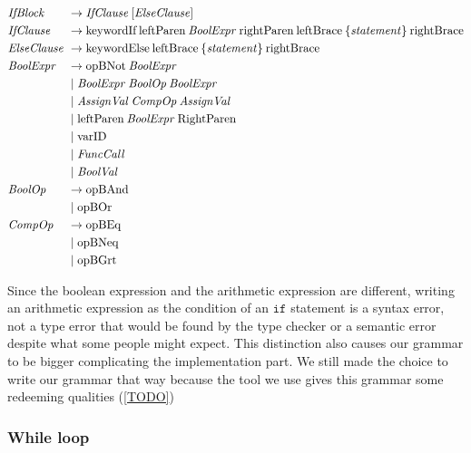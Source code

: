 \begin{align*}
    \omit $\mathit{IfBlock}$ \hfil &\rightarrow \mathit{IfClause} \: [\mathit{ElseClause}] \\
    \omit $\mathit{IfClause}$ \hfil &\rightarrow \text{keywordIf} \: \text{leftParen} \: \mathit{BoolExpr} \: \text{rightParen} \: \text{leftBrace} \: \{ \mathit{statement}\} \: \text{rightBrace} \\
    \omit $\mathit{ElseClause}$ \hfil &\rightarrow \text{keywordElse} \: \text{leftBrace} \: \{ \mathit{statement} \} \: \text{rightBrace} \\
    \omit $\mathit{BoolExpr}$ \hfil &\rightarrow \text{opBNot} \: \mathit{BoolExpr} \\
    & \mid \mathit{BoolExpr} \: \mathit{BoolOp} \: \mathit{BoolExpr} \\
    & \mid \mathit{AssignVal} \: \mathit{CompOp} \: \mathit{AssignVal} \\
    & \mid \text{leftParen} \: \mathit{BoolExpr} \: \text{RightParen} \\
    & \mid \text{varID} \\
    & \mid \mathit{FuncCall} \\
    & \mid \mathit{BoolVal} \\
    \omit $\mathit{BoolOp}$ \hfil &\rightarrow \text{opBAnd} \\
    & \mid \text{opBOr} \\
    \omit $\mathit{CompOp}$ \hfil & \rightarrow \text{opBEq} \\
    & \mid \text{opBNeq} \\
    & \mid \text{opBGrt}
\end{align*}

Since the boolean expression and the arithmetic expression are different, writing an arithmetic expression as the condition of an $\texttt{if}$ statement is a syntax error, not a type error that would be found by the type checker or a semantic error despite what some people might expect.
This distinction also causes our grammar to be bigger complicating the implementation part.
We still made the choice to write our grammar that way because the tool we use gives this grammar some redeeming qualities (\ref{TODO})

\subsubsection*{While loop}

